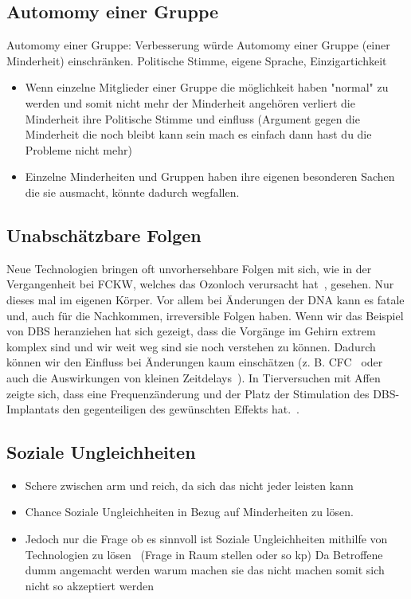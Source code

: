 \documentclass[a4paper,
DIV=13,
12pt,
BCOR=10mm,
department=FakEI,
twoside,
parskip=half,
automark,
]{OTHRartcl}
\begin{document}
\subsection*{Automomy einer Gruppe}
Automomy einer Gruppe: Verbesserung würde Automomy einer Gruppe (einer Minderheit) einschränken. Politische Stimme, eigene Sprache, Einzigartichkeit
\begin{itemize}
    \item Wenn einzelne Mitglieder einer Gruppe die möglichkeit haben "normal" zu werden und somit nicht mehr der Minderheit angehören verliert die Minderheit ihre Politische Stimme und einfluss (Argument gegen die Minderheit die noch bleibt kann sein mach es einfach dann hast du die Probleme nicht mehr)
    \item Einzelne Minderheiten und Gruppen haben ihre eigenen besonderen Sachen die sie ausmacht, könnte dadurch wegfallen.~\cite{lee2016cochlear}
\end{itemize}


\subsection*{Unabschätzbare Folgen}
Neue Technologien bringen oft unvorhersehbare Folgen mit sich, wie in der Vergangenheit bei FCKW, welches das Ozonloch verursacht hat~\cite{rowland1996stratospheric}, gesehen. Nur dieses mal im eigenen Körper.
Vor allem bei Änderungen der DNA kann es fatale und, auch für die Nachkommen, irreversible Folgen haben. Wenn wir das Beispiel von DBS heranziehen hat sich gezeigt, dass die Vorgänge im Gehirn extrem komplex
sind und wir weit weg sind sie noch verstehen zu können. Dadurch können wir den Einfluss bei Änderungen kaum einschätzen (z. B. CFC~\cite{canolty2010functional} oder auch die Auswirkungen von kleinen Zeitdelays~\cite{al2021impact}).
In Tierversuchen mit Affen zeigte sich, dass eine Frequenzänderung und der Platz der Stimulation des DBS-Implantats den gegenteiligen des gewünschten Effekts hat.~\cite{logothetis2010effects}.


\subsection*{Soziale Ungleichheiten}
\begin{itemize}
    \item Schere zwischen arm und reich, da sich das nicht jeder leisten kann
    \item Chance Soziale Ungleichheiten in Bezug auf Minderheiten zu lösen. 
    \item Jedoch nur die Frage ob es sinnvoll ist Soziale Ungleichheiten mithilfe von Technologien zu lösen~\cite{lee2016cochlear} (Frage in Raum stellen oder so kp)
    Da Betroffene dumm angemacht werden warum machen sie das nicht machen somit sich nicht so akzeptiert werden  
\end{itemize}
\end{document}
